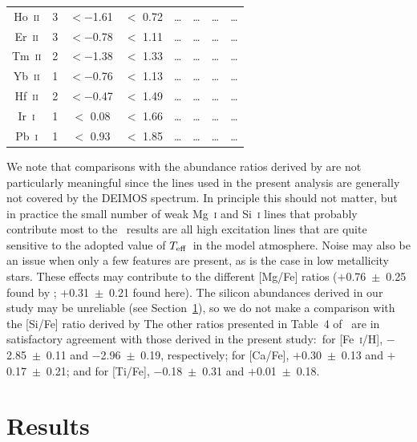 \documentclass[useAMS,usenatbib,usegraphicx]{mn2e}
\def\teff{\mbox{$T_{\rm eff}$}}
\begin{document}
\begin{table}
\begin{minipage}{\textwidth}
\begin{tabular}{cccccccc}
 Ho~\textsc{ii} &   3 & $<-$1.61 &$<$ 0.72 & \ldots& \ldots& \ldots& \ldots \\
 Er~\textsc{ii} &   3 & $<-$0.78 &$<$ 1.11 & \ldots& \ldots& \ldots& \ldots \\
 Tm~\textsc{ii} &   2 & $<-$1.38 &$<$ 1.33 & \ldots& \ldots& \ldots& \ldots \\
 Yb~\textsc{ii} &   1 & $<-$0.76 &$<$ 1.13 & \ldots& \ldots& \ldots& \ldots \\
 Hf~\textsc{ii} &   2 & $<-$0.47 &$<$ 1.49 & \ldots& \ldots& \ldots& \ldots \\
 Ir~\textsc{i}  &   1 & $<$ 0.08 &$<$ 1.66 & \ldots& \ldots& \ldots& \ldots \\
 Pb~\textsc{i}  &   1 & $<$ 0.93 &$<$ 1.85 & \ldots& \ldots& \ldots& \ldots \\
\hline
\end{tabular}
\end{minipage}
\end{table}


We note that comparisons with the abundance ratios derived
by \citet{kirby13} are not particularly meaningful since
the lines used in the present analysis are 
generally not covered by the DEIMOS spectrum.
In principle this should not matter, but in practice 
the small number of weak
Mg~\textsc{i} and Si~\textsc{i} lines that probably contribute most to
the \citeauthor{kirby13}\ results are all high excitation lines
that are quite sensitive to the adopted value of \teff\ 
in the model atmosphere.
Noise may also be an issue when only a few features are present,
as is the case in low metallicity stars.
These effects may contribute to the different [Mg/Fe] ratios 
($+$0.76~$\pm$~0.25 
found by \citeauthor{kirby13};
 $+$0.31~$\pm$~0.21 found here).
The silicon abundances derived in our study may be unreliable
(see Section~\ref{results}), so we do not make a
comparison with the [Si/Fe] ratio derived by \citeauthor{kirby13} %
The other ratios 
presented in Table~4 of \citeauthor{kirby13}\
are in satisfactory agreement with those derived in the present study:\
for [Fe~\textsc{i}/H],  $-$2.85~$\pm$~0.11 
and $-$2.96~$\pm$~0.19, respectively;
for [Ca/Fe], $+$0.30~$\pm$~0.13 
and $+$0.17~$\pm$~0.21; and
for [Ti/Fe], $-$0.18~$\pm$~0.31 
and $+$0.01~$\pm$~0.18.


\section{Results}
\label{results}
\end{document}
